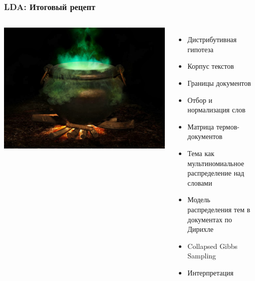 \documentclass[10pt,svgnames]{beamer}
\begin{document}
  \begin{frame}
    \frametitle{LDA: Итоговый рецепт}
    \begin{columns}
      \includegraphics[width=\textwidth]{potion}
      \begin{itemize}
      \item Дистрибутивная гипотеза
      \item Корпус текстов
      \item Границы документов
      \item Отбор и нормализация слов
      \item Матрица термов-документов
      \item Тема как мультиномиальное распределение над словами
      \item Модель распределения тем в документах по Дирихле
      \item Collapsed Gibbs Sampling
      \item Интерпретация
      \end{itemize}
    \end{columns}
  \end{frame}
\end{document}
